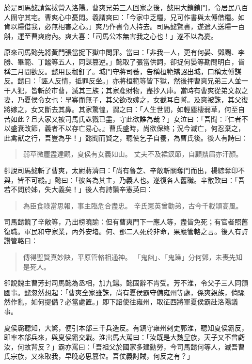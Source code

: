 於是司馬懿請駕拔營入洛陽。曹爽兄弟三人回家之後，懿用大鎖鎖門，令居民八百人圍守其宅。曹爽心中憂悶。羲謂爽曰：「今家中乏糧，兄可作書與太傅借糧。如肯以糧借我，必無相害之心。」爽乃作書令人持去。司馬懿覽書，遂遣人送糧一百斛，運至曹爽府內。爽大喜：「司馬公本無害我之心也！」遂不以為憂。

原來司馬懿先將黃門張當捉下獄中問罪。當曰：「非我一人，更有何晏、鄧颺、李勝、畢範、丁謐等五人，同謀篡逆。」懿取了張當供詞，卻捉何晏等勘問明白，皆稱三月間欲反。懿用長枷釘了。城門守將司蕃，告稱桓範矯詔出城，口稱太傅謀反。懿曰：「誣人反情，抵罪反坐。」亦將桓範等皆下獄，然後押曹爽兄弟三人並一干人犯，皆斬於市曹，滅其三族；其家產財物，盡抄入庫。當時有曹爽從弟文叔之妻，乃夏侯令女也：早寡而無子，其父欲改嫁之，女截耳自誓。及爽被誅，其父復將嫁之，女又斷去其鼻。其家驚惶，謂之曰：「人生世間，如輕塵棲弱草，何至自苦如此？且大家又被司馬氏誅戮已盡，守此欲誰為哉？」女泣曰：「吾聞：『仁者不以盛衰改節，義者不以存亡易心。』曹氏盛時，尚欲保終；況今滅亡，何忍棄之，此禽獸之行，吾豈為乎！」懿聞而賢之，聽使乞子自養，為曹氏後。後人有詩曰：

\begin{quote}
弱草微塵盡達觀，夏侯有女義如山。
丈夫不及裙釵節，自顧鬚眉亦汗顏。
\end{quote}

卻說司馬懿斬了曹爽，太尉蔣濟曰：「尚有魯芝、辛敞斬關奪門而出，楊綜奪印不與，皆不可縱。」懿曰：「彼各為其主，乃義人也。遂復各人舊職。辛敞歎曰：「吾若不問於姊，失大義矣！」後人有詩讚辛憲英曰：

\begin{quote}
為臣食祿當思報，事主臨危合盡忠。
辛氏憲英曾勸弟，古今千載頌高風。
\end{quote}

司馬懿饒了辛敞等，乃出榜曉諭：但有曹爽門下一應人等，盡皆免死；有官者照舊復職。軍民和守家業，內外安堵。何、鄧二人死於非命，果應管輅之言。後人有詩讚管輅曰：

\begin{quote}
傳得聖賢真妙訣，平原管輅相通神。
「鬼幽」、「鬼躁」分何鄧，未喪先知是死人。
\end{quote}

卻說魏主曹芳封司馬懿為丞相，加九鍚。懿固辭不肯受。芳不淮，令父子三人同領國事。懿忽然想起：「曹爽全家雖誅，尚有夏侯霸守備雍州等處，係爽親族，倘驟然作亂，如何提備？必當處置。」即下詔使往雍州，取征西將軍夏侯霸赴洛陽議事。

夏侯霸聽知，大驚，便引本部三千兵造反。有鎮守雍州剌史郭淮，聽知夏侯霸反，即率本部兵來，與夏侯霸交戰。淮出馬大罵曰：「汝既是大魏皇族，天子又不曾虧汝，何故背反？」霸亦罵曰：「吾祖父於國家多建勳勞，今司馬懿何等人，滅吾曹氏宗族，又來取我，早晚必思篡位。吾仗義討賊，何反之有？」

